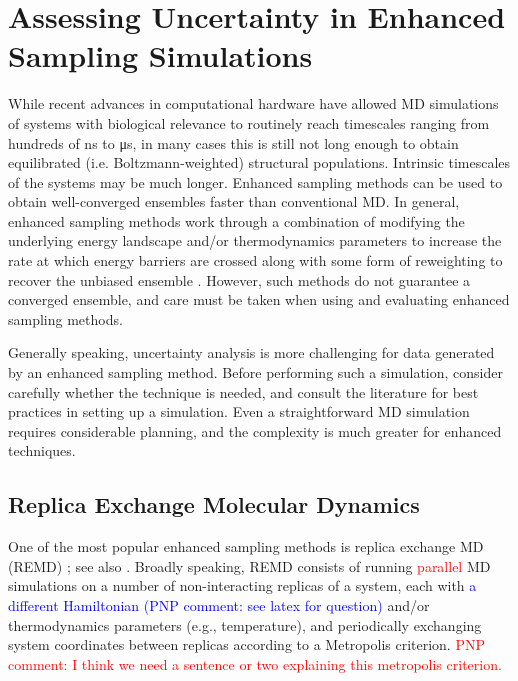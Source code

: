 \section{Assessing Uncertainty in Enhanced Sampling Simulations}
\label{sec:enhanced}

While recent advances in computational hardware have allowed MD simulations of systems with biological relevance to routinely reach timescales ranging from hundreds of \si{\nano\second} to \si{\micro\second}, in many cases this is still not long enough to obtain equilibrated (i.e. Boltzmann-weighted) structural populations.  Intrinsic timescales of the systems may be much longer.
Enhanced sampling methods can be used to obtain well-converged ensembles faster than conventional MD. In general, enhanced sampling methods work through a combination of modifying the underlying energy landscape and/or thermodynamics parameters to increase the rate at which energy barriers are crossed along with some form of reweighting to recover the unbiased ensemble \cite{Zuckerman2011}. However, such methods do not guarantee a converged ensemble, and care must be taken when using and evaluating enhanced sampling methods.

Generally speaking, uncertainty analysis is more challenging for data generated by an enhanced sampling method.
Before performing such a simulation, consider carefully whether the technique is needed, and consult the literature for best practices in setting up a simulation.
Even a straightforward MD simulation requires considerable planning, and the complexity is much greater for enhanced techniques.

\subsection{Replica Exchange Molecular Dynamics}
One of the most popular enhanced sampling methods is replica exchange MD (REMD) \citep{Sugita1999}; see also \cite{Swendsen-1986}. Broadly speaking, REMD consists of running \textcolor{red}{parallel} MD simulations on a number of non-interacting replicas of a system, each with \textcolor{blue}{a different Hamiltonian (PNP comment: see latex for question)} and/or thermodynamics parameters (e.g., temperature), and periodically exchanging system coordinates between replicas according to a Metropolis criterion.  \textcolor{red}{PNP comment: I think we need a sentence or two explaining this metropolis criterion.}



